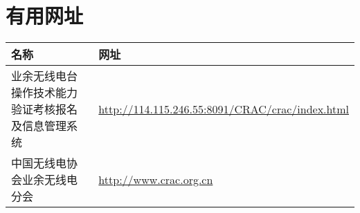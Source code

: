 

\newpage

\section{有用网址}

\begin{longtable}{|p{8cm}|p{8cm}|}
	\hline
	\textbf{名称} & \textbf{网址} \\
	\hline
	业余无线电台操作技术能力验证考核报名及信息管理系统 & \url{http://114.115.246.55:8091/CRAC/crac/index.html} \\
	\hline
	中国无线电协会业余无线电分会 & \url{http://www.crac.org.cn} \\
	\hline
\end{longtable}
